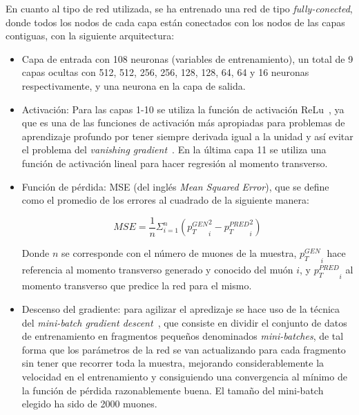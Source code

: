 En cuanto al tipo de red utilizada, se ha entrenado una red de tipo \textit{fully-conected}, donde todos los nodos de cada capa est\'an conectados con los nodos de las capas contiguas, con la siguiente arquitectura:


\begin{itemize}

\item Capa de entrada con 108 neuronas (variables de entrenamiento), un total de 9 capas ocultas con 512, 512, 256, 256, 128, 128, 64, 64 y 16 neuronas respectivamente, y una neurona en la capa de salida.

\item Activaci\'on: Para las capas 1-10 se utiliza la funci\'on de activaci\'on ReLu~\cite{agarap2018deep}, ya que es una de las funciones de activaci\'on m\'as apropiadas para problemas de aprendizaje profundo por tener siempre derivada igual a la unidad y as\'i evitar el problema del \textit{vanishing gradient}~\cite{Hochreiter:91}. En la \'ultima capa 11 se utiliza una funci\'on de activaci\'on lineal para hacer regresi\'on al momento transverso.

\item Funci\'on de p\'erdida: MSE (del ingl\'es \textit{Mean Squared Error}), que se define como el promedio de los errores al cuadrado de la siguiente manera:

\begin{equation}
  MSE = \frac{1}{n}\Sigma_{i=1}^{n}{\left({p_{T}^{GEN}}_i^2 - {p_{T}^{PRED}}_i^2\right)}
\label{eq:MSE}
\end{equation}

Donde $n$ se corresponde con el n\'umero de muones de la muestra, ${p_{T}^{GEN}}_i$ hace referencia al momento transverso generado y conocido del mu\'on $i$, y ${p_{T}^{PRED}}_i$ al momento transverso que predice la red para el mismo. 

\item Descenso del gradiente: para agilizar el apredizaje se hace uso de la t\'ecnica del \textit{mini-batch gradient descent}~\cite{perrone2019optimal}, que consiste en dividir el conjunto de datos de entrenamiento en fragmentos peque\~nos denominados \textit{mini-batches}, de tal forma que los par\'ametros de la red se van actualizando para cada fragmento sin tener que recorrer toda la muestra, mejorando considerablemente la velocidad en el entrenamiento y consiguiendo una convergencia al m\'inimo de la funci\'on de p\'erdida razonablemente buena. El tama\~no del mini-batch elegido ha sido de 2000 muones.


\end{itemize}
